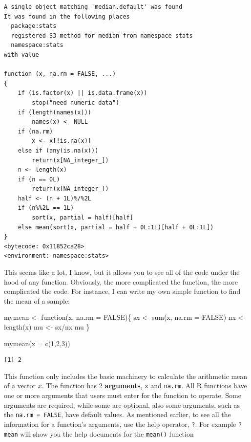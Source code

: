 \documentclass[
  letterpaper,
  DIV=11,
  numbers=noendperiod]{scrreprt}
\newenvironment{Shaded}{\begin{snugshade}}{\end{snugshade}}
\newcommand{\AttributeTok}[1]{\textcolor[rgb]{0.40,0.45,0.13}{#1}}
\newcommand{\ConstantTok}[1]{\textcolor[rgb]{0.56,0.35,0.01}{#1}}
\newcommand{\ControlFlowTok}[1]{\textcolor[rgb]{0.00,0.23,0.31}{#1}}
\newcommand{\DecValTok}[1]{\textcolor[rgb]{0.68,0.00,0.00}{#1}}
\newcommand{\FunctionTok}[1]{\textcolor[rgb]{0.28,0.35,0.67}{#1}}
\newcommand{\NormalTok}[1]{\textcolor[rgb]{0.00,0.23,0.31}{#1}}
\newcommand{\OtherTok}[1]{\textcolor[rgb]{0.00,0.23,0.31}{#1}}
\newcommand{\SpecialCharTok}[1]{\textcolor[rgb]{0.37,0.37,0.37}{#1}}
\begin{document}
\begin{verbatim}
A single object matching 'median.default' was found
It was found in the following places
  package:stats
  registered S3 method for median from namespace stats
  namespace:stats
with value

function (x, na.rm = FALSE, ...) 
{
    if (is.factor(x) || is.data.frame(x)) 
        stop("need numeric data")
    if (length(names(x))) 
        names(x) <- NULL
    if (na.rm) 
        x <- x[!is.na(x)]
    else if (any(is.na(x))) 
        return(x[NA_integer_])
    n <- length(x)
    if (n == 0L) 
        return(x[NA_integer_])
    half <- (n + 1L)%/%2L
    if (n%%2L == 1L) 
        sort(x, partial = half)[half]
    else mean(sort(x, partial = half + 0L:1L)[half + 0L:1L])
}
<bytecode: 0x11852ca28>
<environment: namespace:stats>
\end{verbatim}

This seems like a lot, I know, but it allows you to see all of the code
under the hood of any function. Obviously, the more complicated the
function, the more complicated the code. For instance, I can write my
own simple function to find the mean of a sample:

\begin{Shaded}
\begin{Highlighting}[]
\NormalTok{mymean }\OtherTok{\textless{}{-}} \ControlFlowTok{function}\NormalTok{(x,}
                   \AttributeTok{na.rm =} \ConstantTok{FALSE}\NormalTok{)\{}
\NormalTok{  sx }\OtherTok{\textless{}{-}} \FunctionTok{sum}\NormalTok{(x, }
            \AttributeTok{na.rm =} \ConstantTok{FALSE}\NormalTok{)}
\NormalTok{  nx }\OtherTok{\textless{}{-}} \FunctionTok{length}\NormalTok{(x)}
\NormalTok{  mu }\OtherTok{\textless{}{-}}\NormalTok{ sx}\SpecialCharTok{/}\NormalTok{nx}
\NormalTok{  mu}
\NormalTok{\}}

\FunctionTok{mymean}\NormalTok{(}\AttributeTok{x =} \FunctionTok{c}\NormalTok{(}\DecValTok{1}\NormalTok{,}\DecValTok{2}\NormalTok{,}\DecValTok{3}\NormalTok{))}
\end{Highlighting}
\end{Shaded}

\begin{verbatim}
[1] 2
\end{verbatim}

This function only includes the basic machinery to calculate the
arithmetic mean of a vector \(x\). The function has 2
\textbf{arguments}, \texttt{x} and \texttt{na.rm}. All R functions have
one or more arguments that users must enter for the function to operate.
Some arguments are required, while some are optional, also some
arguments, such as the \texttt{na.rm\ =\ FALSE}, have default values. As
mentioned earlier, to see all the information for a function's
arguments, use the help operator, \texttt{?}. For example \texttt{?mean}
will show you the help documents for the \texttt{mean()} function
\end{document}
